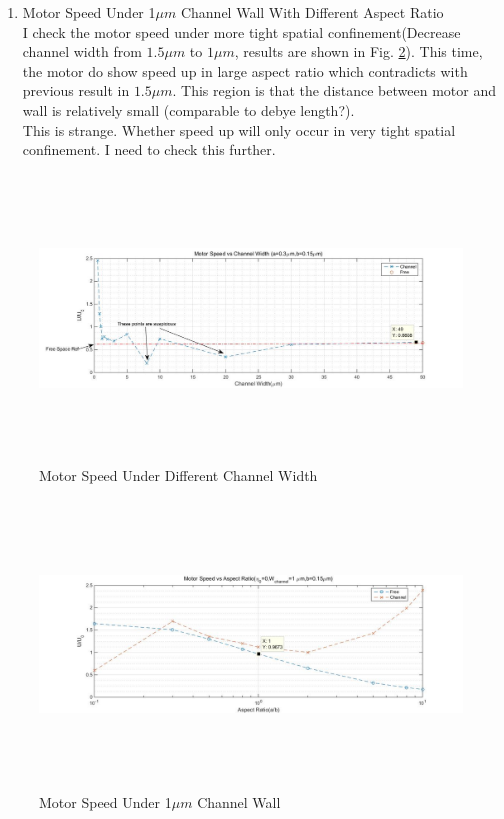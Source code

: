 \documentclass[fontsize=11pt, %
                             paper=a4, %
                             twoside, %
                             captions=tableheading,
                             index=totoc,
                             hyperref]{labbook}
\begin{document}
\begin{addmargin}[4cm]{0cm}
\begin{enumerate}
\item
Motor Speed Under 1$\mu m$ Channel Wall With Different Aspect Ratio\\
I check the motor speed under more tight spatial confinement(Decrease channel width from $1.5 \mu m$ to $1 \mu m$, results are shown in Fig. \ref{2016-11-5-MSU1CW}). This time, the motor do show speed up in large aspect ratio which contradicts with previous result in $1.5\mu m$. This region is that the distance between motor and wall is relatively small (comparable to debye length?). \\
This is strange. Whether speed up will only occur in very tight spatial confinement. I need to check this further. 
\end{enumerate}
\begin{figure}
\centering
\includegraphics[width=\linewidth, height=3in]{2016-11-5-diff-channel-width.jpg}
\caption{Motor Speed Under Different Channel Width}\label{2016-11-5-MSUDCW}
\end{figure}

\begin{figure}
\centering
\includegraphics[width=\linewidth, height=3in]{2016-11-5-eta-0-wall-1.jpg}
\caption{Motor Speed Under 1$\mu m$ Channel Wall}\label{2016-11-5-MSU1CW}
\end{figure}


\end{addmargin}
\end{document}
